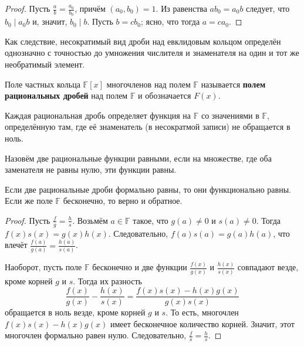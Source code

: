 \begin{proof}
    Пусть $\displaystyle\frac{a}{b} = \frac{a_0}{b_0}$, причём $(a_0, b_0) = 1$. Из равенства $ab_0 = a_0b$ следует, что $b_0 \mid a_0b$ и, значит, $b_0 \mid b$. Пусть $b = cb_0$; ясно, что тогда $a = ca_0$.
\end{proof}

\begin{remark}
    Как следствие, несократимый вид дроби над евклидовым кольцом определён однозначно с точностью до умножения числителя и знаменателя на один и тот же необратимый элемент.
\end{remark}

\begin{definition}
    Поле частных кольца $\mathbb{F}[x]$ многочленов над полем $\mathbb{F}$ называется \textbf{полем рациональных дробей} над полем $\mathbb{F}$ и обозначается $F(x)$.
\end{definition}

Каждая рациональная дробь определяет функция на $\mathbb{F}$ со значениями в $\mathbb{F}$, определённую там, где её знаменатель (в несократмой записи) не обращается в ноль.

\begin{definition}
    Назовём две рациональные функции равными, если на множестве, где оба заменателя не равны нулю, эти функции равны.
\end{definition}

\begin{theorem}
    Если две рациональные дроби формально равны, то они функционально равны. Если же поле $\mathbb{F}$ бесконечно, то верно и обратное.
\end{theorem}

\begin{proof}
    Пусть $\frac{f}{g} = \frac{h}{s}$. Возьмём $a \in \mathbb{F}$ такое, что $g(a) \ne 0$ и $s(a) \ne 0$. Тогда $f(x)s(x) = g(x)h(x)$. Следовательно, $f(a)s(a) = g(a)h(a)$, что влечёт $\frac{f(a)}{g(a)} = \frac{h(a)}{s(a)}$.

    Наоборот, пусть поле $\mathbb{F}$ бесконечно и две функции $\frac{f(x)}{g(x)}$ и $\frac{h(x)}{s(x)}$ совпадают везде, кроме корней $g$ и $s$. Тогда их разность
    $$
    \frac{f(x)}{g(x)} - \frac{h(x)}{s(x)} = \frac{f(x)s(x) - h(x)g(x)}{g(x)s(x)}
    $$
    обращается в ноль везде, кроме корней $g$ и $s$. То есть, многочлен $f(x)s(x) - h(x)g(x)$ имеет бесконечное количество корней. Значит, этот многочлен формально равен нулю. Следовательно, $\frac{f}{s} = \frac{h}{s}$.
\end{proof}


